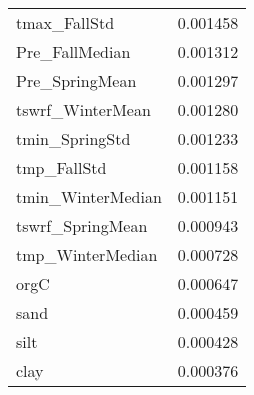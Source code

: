 \begin{tabular}{lr}
tmax_FallStd & 0.001458 \\
Pre_FallMedian & 0.001312 \\
Pre_SpringMean & 0.001297 \\
tswrf_WinterMean & 0.001280 \\
tmin_SpringStd & 0.001233 \\
tmp_FallStd & 0.001158 \\
tmin_WinterMedian & 0.001151 \\
tswrf_SpringMean & 0.000943 \\
tmp_WinterMedian & 0.000728 \\
orgC & 0.000647 \\
sand & 0.000459 \\
silt & 0.000428 \\
clay & 0.000376 \\
\bottomrule
\end{tabular}
